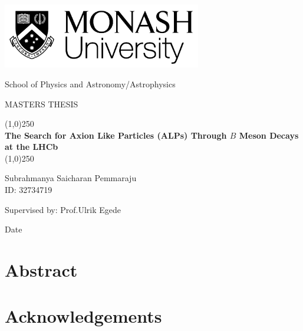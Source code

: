 \documentclass[10pt]{report}
\begin{document}
\label{firstpage}

\begin{titlepage}
    \begin{center}
        
        \vspace{1.5cm}
        \includegraphics[width=0.65\textwidth]{monashlogo.png}
        
        \large
        {School of Physics and Astronomy/Astrophysics}
        
        \vspace{2.5cm}
        \Large
        {MASTERS THESIS}
        
        \huge
        \line(1,0){250}\\
        \textbf{The Search for Axion Like Particles (ALPs) Through $B$ Meson Decays at the LHCb}\\
        \line(1,0){250}
        
        \vspace{2.0cm}
        \huge
        {Subrahmanya Saicharan Pemmaraju}\\
        \Large
        {ID: 32734719}
        
        \vspace{1.5cm}
        \huge
        {Supervised by: Prof.Ulrik Egede}
        
        \vspace{5.5cm}
        \Large
        {Date}
        
    \end{center}
\end{titlepage}


\newpage
\chapter*{Abstract}

\newpage
\chapter*{Acknowledgements}
\end{document}
